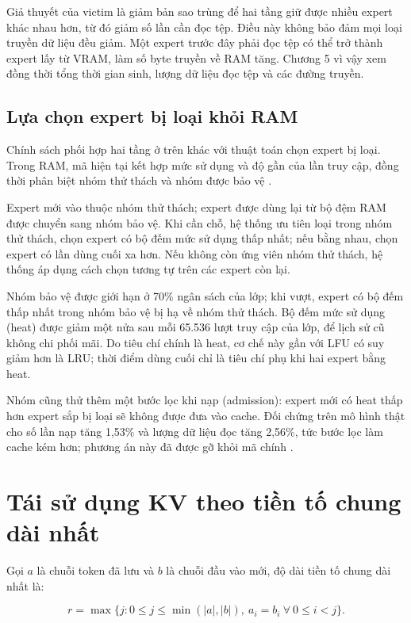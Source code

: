 Giả thuyết của victim là giảm bản sao trùng để hai tầng giữ được nhiều expert khác nhau hơn, từ đó giảm số lần cần đọc tệp. Điều này không bảo đảm mọi loại truyền dữ liệu đều giảm. Một expert trước đây phải đọc tệp có thể trở thành expert lấy từ VRAM, làm số byte truyền về RAM tăng. Chương 5 vì vậy xem đồng thời tổng thời gian sinh, lượng dữ liệu đọc tệp và các đường truyền.

\subsection{Lựa chọn expert bị loại khỏi RAM}

Chính sách phối hợp hai tầng ở trên khác với thuật toán chọn expert bị loại. Trong RAM, mã hiện tại kết hợp mức sử dụng và độ gần của lần truy cập, đồng thời phân biệt nhóm thử thách và nhóm được bảo vệ \cite{moe_tierengine_arch}.

Expert mới vào thuộc nhóm thử thách; expert được dùng lại từ bộ đệm RAM được chuyển sang nhóm bảo vệ. Khi cần chỗ, hệ thống ưu tiên loại trong nhóm thử thách, chọn expert có bộ đếm mức sử dụng thấp nhất; nếu bằng nhau, chọn expert có lần dùng cuối xa hơn. Nếu không còn ứng viên nhóm thử thách, hệ thống áp dụng cách chọn tương tự trên các expert còn lại.

Nhóm bảo vệ được giới hạn ở 70\% ngân sách của lớp; khi vượt, expert có bộ đếm thấp nhất trong nhóm bảo vệ bị hạ về nhóm thử thách. Bộ đếm mức sử dụng (heat) được giảm một nửa sau mỗi 65.536 lượt truy cập của lớp, để lịch sử cũ không chi phối mãi. Do tiêu chí chính là heat, cơ chế này gần với LFU có suy giảm hơn là LRU; thời điểm dùng cuối chỉ là tiêu chí phụ khi hai expert bằng heat.

Nhóm cũng thử thêm một bước lọc khi nạp (admission): expert mới có heat thấp hơn expert sắp bị loại sẽ không được đưa vào cache. Đối chứng trên mô hình thật cho số lần nạp tăng 1,53\% và lượng dữ liệu đọc tăng 2,56\%, tức bước lọc làm cache kém hơn; phương án này đã được gỡ khỏi mã chính \cite{exp_negative}.

\section{Tái sử dụng KV theo tiền tố chung dài nhất}

Gọi $a$ là chuỗi token đã lưu và $b$ là chuỗi đầu vào mới, độ dài tiền tố chung dài nhất là:

\begin{equation}
\label{eq:4.1}
r=\max\{j:0\leq j\leq\min(|a|,|b|),\ a_i=b_i\ \forall\ 0\leq i<j\}.
\end{equation}

